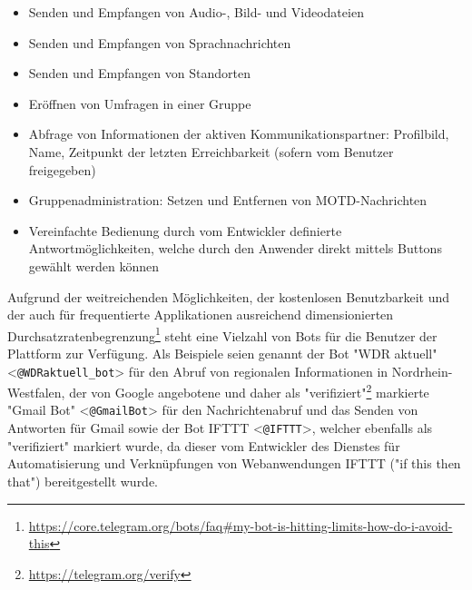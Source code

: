 \begin{itemize}
\item Senden und Empfangen von Audio-, Bild- und Videodateien
\item Senden und Empfangen von Sprachnachrichten
\item Senden und Empfangen von Standorten
\item Eröffnen von Umfragen in einer Gruppe
\item Abfrage von Informationen der aktiven Kommunikationspartner: Profilbild, Name, Zeitpunkt der letzten Erreichbarkeit (sofern vom Benutzer freigegeben)
\item Gruppenadministration: Setzen und Entfernen von MOTD-Nachrichten
\item Vereinfachte Bedienung durch vom Entwickler definierte Antwortmöglichkeiten, welche durch den Anwender direkt mittels Buttons gewählt werden können
\end{itemize}

Aufgrund der weitreichenden Möglichkeiten, der kostenlosen Benutzbarkeit und der auch für frequentierte Applikationen ausreichend dimensionierten Durchsatzratenbegrenzung\footnote{\url{https://core.telegram.org/bots/faq\#my-bot-is-hitting-limits-how-do-i-avoid-this}} steht eine Vielzahl von Bots für die Benutzer der Plattform zur Verfügung. Als Beispiele seien genannt der Bot "WDR aktuell" <\lstinline{@WDRaktuell_bot}> für den Abruf von regionalen Informationen in Nordrhein-Westfalen, der von Google angebotene und daher als "verifiziert"\footnote{\url{https://telegram.org/verify}} markierte "Gmail Bot" <\lstinline{@GmailBot}> für den Nachrichtenabruf und das Senden von Antworten für Gmail sowie der Bot IFTTT <\lstinline{@IFTTT}>, welcher ebenfalls als "verifiziert" markiert wurde, da dieser vom Entwickler des Dienstes für Automatisierung und Verknüpfungen von Webanwendungen IFTTT ("if this then that") bereitgestellt wurde.

